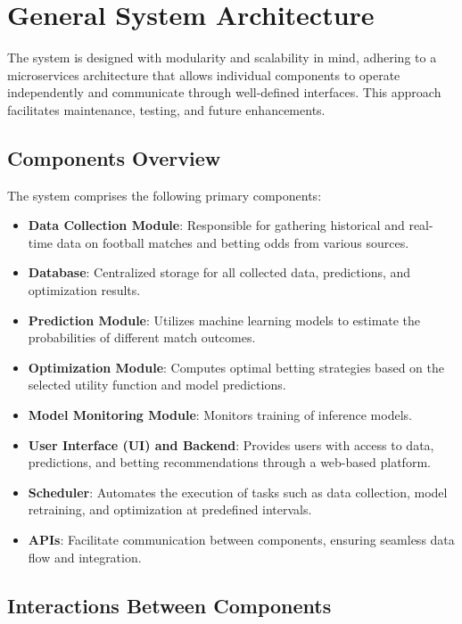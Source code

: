\section{General System Architecture}

The system is designed with modularity and scalability in mind, adhering to a microservices architecture \cite{Newman2015} that allows individual components to operate independently and communicate through well-defined interfaces. This approach facilitates maintenance, testing, and future enhancements.

\subsection{Components Overview}

The system comprises the following primary components:

\begin{itemize}
    \item \textbf{Data Collection Module}: Responsible for gathering historical and real-time data on football matches and betting odds from various sources.
    \item \textbf{Database}: Centralized storage for all collected data, predictions, and optimization results.
    \item \textbf{Prediction Module}: Utilizes machine learning models to estimate the probabilities of different match outcomes.
    \item \textbf{Optimization Module}: Computes optimal betting strategies based on the selected utility function and model predictions.
    \item \textbf{Model Monitoring Module}: Monitors training of inference models.
    \item \textbf{User Interface (UI) and Backend}: Provides users with access to data, predictions, and betting recommendations through a web-based platform.
    \item \textbf{Scheduler}: Automates the execution of tasks such as data collection, model retraining, and optimization at predefined intervals.
    \item \textbf{APIs}: Facilitate communication between components, ensuring seamless data flow and integration.
\end{itemize}

\subsection{Interactions Between Components}

